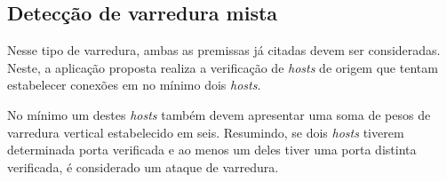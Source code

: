 \subsection{Detecção de varredura mista}

Nesse tipo de varredura, ambas as premissas já citadas devem ser consideradas. Neste, a aplicação proposta realiza a verificação de \textit{hosts} de origem que tentam estabelecer conexões em no mínimo dois \textit{hosts}. 

No mínimo um destes \textit{hosts} também devem apresentar uma soma de pesos de varredura vertical estabelecido em seis. Resumindo, se dois \textit{hosts} tiverem determinada porta verificada e ao menos um deles tiver uma porta distinta verificada, é considerado um ataque de varredura.


